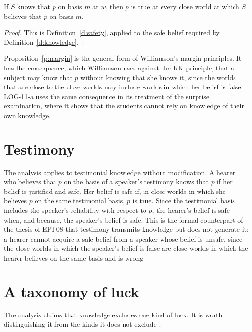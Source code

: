 \documentclass{situationist-preprint}
\begin{document}
\begin{proposition}\label{p:margin}
If $S$ knows that $p$ on basis $m$ at $w$, then $p$ is true at every close world at which $S$ believes that $p$ on basis $m$.
\end{proposition}

\begin{proof}
This is Definition~\ref{d:safety}, applied to the safe belief required by Definition~\ref{d:knowledge}.
\end{proof}

Proposition~\ref{p:margin} is the general form of Williamson's margin principles. It has the consequence, which Williamson uses against the KK principle, that a subject may know that $p$ without knowing that she knows it, since the worlds that are close to the close worlds may include worlds in which her belief is false. LOG-11-a uses the same consequence in its treatment of the surprise examination, where it shows that the students cannot rely on knowledge of their own knowledge.

\section{Testimony}

The analysis applies to testimonial knowledge without modification. A hearer who believes that $p$ on the basis of a speaker's testimony knows that $p$ if her belief is justified and safe. Her belief is safe if, in close worlds in which she believes $p$ on the same testimonial basis, $p$ is true. Since the testimonial basis includes the speaker's reliability with respect to $p$, the hearer's belief is safe when, and because, the speaker's belief is safe. This is the formal counterpart of the thesis of EPI-08 that testimony transmits knowledge but does not generate it: a hearer cannot acquire a safe belief from a speaker whose belief is unsafe, since the close worlds in which the speaker's belief is false are close worlds in which the hearer believes on the same basis and is wrong.

\section{A taxonomy of luck}

The analysis claims that knowledge excludes one kind of luck. It is worth distinguishing it from the kinds it does not exclude \citep{Pritchard2005}.
\end{document}
